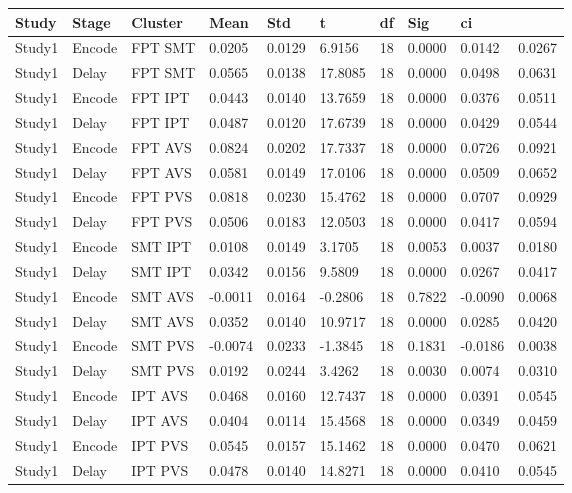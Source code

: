 \begin{table}
\centering
\begin{tabular}[0.2em]{@{}llllllllll@{}}\toprule
Study & Stage & Cluster & Mean & Std & t & df & Sig & ci\\\toprule[0.2em]
Study1 & Encode & FPT SMT & 0.0205 & 0.0129 & 6.9156 & 18 & 0.0000 & 0.0142 & 0.0267 \\\midrule
Study1 & Delay & FPT SMT & 0.0565 & 0.0138 & 17.8085 & 18 & 0.0000 & 0.0498 & 0.0631 \\\midrule
Study1 & Encode & FPT IPT & 0.0443 & 0.0140 & 13.7659 & 18 & 0.0000 & 0.0376 & 0.0511 \\\midrule
Study1 & Delay & FPT IPT & 0.0487 & 0.0120 & 17.6739 & 18 & 0.0000 & 0.0429 & 0.0544 \\\midrule
Study1 & Encode & FPT AVS & 0.0824 & 0.0202 & 17.7337 & 18 & 0.0000 & 0.0726 & 0.0921 \\\midrule
Study1 & Delay & FPT AVS & 0.0581 & 0.0149 & 17.0106 & 18 & 0.0000 & 0.0509 & 0.0652 \\\midrule
Study1 & Encode & FPT PVS & 0.0818 & 0.0230 & 15.4762 & 18 & 0.0000 & 0.0707 & 0.0929 \\\midrule
Study1 & Delay & FPT PVS & 0.0506 & 0.0183 & 12.0503 & 18 & 0.0000 & 0.0417 & 0.0594 \\\midrule
Study1 & Encode & SMT IPT & 0.0108 & 0.0149 & 3.1705 & 18 & 0.0053 & 0.0037 & 0.0180 \\\midrule
Study1 & Delay & SMT IPT & 0.0342 & 0.0156 & 9.5809 & 18 & 0.0000 & 0.0267 & 0.0417 \\\midrule
Study1 & Encode & SMT AVS & -0.0011 & 0.0164 & -0.2806 & 18 & 0.7822 & -0.0090 & 0.0068 \\\midrule
Study1 & Delay & SMT AVS & 0.0352 & 0.0140 & 10.9717 & 18 & 0.0000 & 0.0285 & 0.0420 \\\midrule
Study1 & Encode & SMT PVS & -0.0074 & 0.0233 & -1.3845 & 18 & 0.1831 & -0.0186 & 0.0038 \\\midrule
Study1 & Delay & SMT PVS & 0.0192 & 0.0244 & 3.4262 & 18 & 0.0030 & 0.0074 & 0.0310 \\\midrule
Study1 & Encode & IPT AVS & 0.0468 & 0.0160 & 12.7437 & 18 & 0.0000 & 0.0391 & 0.0545 \\\midrule
Study1 & Delay & IPT AVS & 0.0404 & 0.0114 & 15.4568 & 18 & 0.0000 & 0.0349 & 0.0459 \\\midrule
Study1 & Encode & IPT PVS & 0.0545 & 0.0157 & 15.1462 & 18 & 0.0000 & 0.0470 & 0.0621 \\\midrule
Study1 & Delay & IPT PVS & 0.0478 & 0.0140 & 14.8271 & 18 & 0.0000 & 0.0410 & 0.0545 \\\midrule

\end{tabular}
\end{table}

